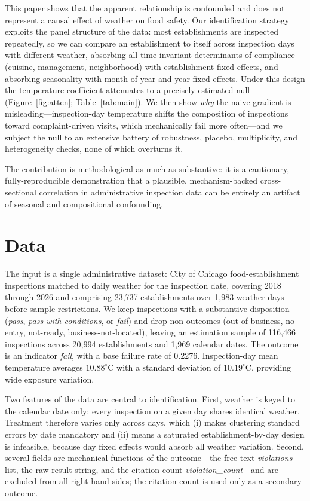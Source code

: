 \documentclass[11pt]{article}
\begin{document}
This paper shows that the apparent relationship is confounded and does not represent a
causal effect of weather on food safety. Our identification strategy exploits the panel
structure of the data: most establishments are inspected repeatedly, so we can compare an
establishment to itself across inspection days with different weather, absorbing all
time-invariant determinants of compliance (cuisine, management, neighborhood) with
establishment fixed effects, and absorbing seasonality with month-of-year and year fixed
effects. Under this design the temperature coefficient attenuates to a precisely-estimated
null (Figure~\ref{fig:atten}; Table~\ref{tab:main}). We then show \emph{why} the naive
gradient is misleading---inspection-day temperature shifts the composition of inspections
toward complaint-driven visits, which mechanically fail more often---and we subject the
null to an extensive battery of robustness, placebo, multiplicity, and heterogeneity
checks, none of which overturns it.

The contribution is methodological as much as substantive: it is a cautionary,
fully-reproducible demonstration that a plausible, mechanism-backed cross-sectional
correlation in administrative inspection data can be entirely an artifact of seasonal and
compositional confounding.

\section{Data}
The input is a single administrative dataset: City of Chicago food-establishment
inspections matched to daily weather for the inspection date, covering 2018 through 2026
and comprising 23{,}737 establishments over 1{,}983 weather-days before sample
restrictions. We keep inspections with a substantive disposition (\emph{pass},
\emph{pass with conditions}, or \emph{fail}) and drop non-outcomes (out-of-business,
no-entry, not-ready, business-not-located), leaving an estimation sample of 116{,}466
inspections across 20{,}994 establishments and 1{,}969 calendar dates. The outcome is an
indicator \emph{fail}, with a base failure rate of 0.2276. Inspection-day mean temperature
averages $10.88^\circ$C with a standard deviation of $10.19^\circ$C, providing wide
exposure variation.

Two features of the data are central to identification. First, weather is keyed to the
calendar date only: every inspection on a given day shares identical weather. Treatment
therefore varies only across days, which (i) makes clustering standard errors by date
mandatory and (ii) means a saturated establishment-by-day design is infeasible, because
day fixed effects would absorb all weather variation. Second, several fields are mechanical
functions of the outcome---the free-text \emph{violations} list, the raw result string, and
the citation count \emph{violation\_count}---and are excluded from all right-hand sides; the
citation count is used only as a secondary outcome.
\end{document}
